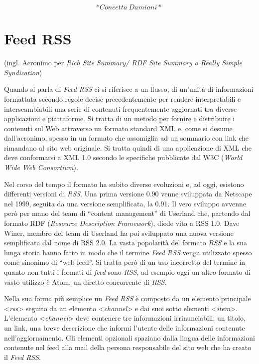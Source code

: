 \documentclass[
  b5paper,
  twoside,
  12pt,
  chapterprefix=false,
  bibliography=totocnumbered,
  parskip=false]{scrbook}
\begin{document}
\[*Concetta~Damiani*\]

\hypertarget{feed-rss}{%
\chapter{Feed RSS}\label{feed-rss}}

(ingl. Acronimo per \emph{Rich Site Summary/ RDF Site Summary o Really Simple
Syndication})

Quando si parla di \emph{Feed RSS} ci si riferisce a un flusso, di un'unità
di informazioni formattata secondo regole decise precedentemente per
rendere interpretabili e interscambiabili una serie di contenuti
frequentemente aggiornati tra diverse applicazioni e piattaforme. Si
tratta di un metodo per fornire e distribuire i contenuti sul Web
attraverso un formato standard XML e, come si desume dall'acronimo,
spesso in un formato che assomiglia ad un sommario con link che
rimandano al sito web originale. Si tratta quindi di una applicazione di
XML che deve conformarsi a XML 1.0 secondo le specifiche pubblicate dal
W3C (\emph{World Wide Web Consortium}).

Nel corso del tempo il formato ha subito diverse evoluzioni e, ad oggi,
esistono differenti versioni di \emph{RSS}. Una prima versione 0.90 venne
sviluppata da Netscape nel 1999, seguita da una versione semplificata,
la 0.91. Il vero sviluppo avvenne però per mano del team di \enquote{content
management} di Userland che, partendo dal formato RDF (\emph{Resource
Description Framework}), diede vita a RSS 1.0. Dave Winer, membro del
team di Userland ha poi sviluppato una nuova versione semplificata dal
nome di RSS 2.0. La vasta popolarità del formato \emph{RSS} e la sua lunga
storia hanno fatto in modo che il termine \emph{Feed RSS} venga utilizzato
spesso come sinonimo di \enquote{web feed}. Si tratta però di un uso incorretto
del termine in quanto non tutti i formati di \emph{feed} sono \emph{RSS}, ad
esempio oggi un altro formato di vasto utilizzo è Atom, un diretto
concorrente di \emph{RSS}.

Nella sua forma più semplice un \emph{Feed RSS} è composto da un elemento
principale \textless{}\emph{rss}\textgreater{} seguito da un elemento \textless{}\emph{channel}\textgreater{} e dai suoi
sotto elementi \textless{}\emph{item}\textgreater. L'elemento \textless{}\emph{channel}\textgreater{} deve contenere tre
informazioni irrinunciabili: un titolo, un link, una breve descrizione
che informi l'utente delle informazioni contenute nell'aggiornamento.
Gli elementi opzionali spaziano dalla lingua delle informazioni
contenute nel feed alla mail della persona responsabile del sito web che
ha creato il \emph{Feed RSS}.
\end{document}
